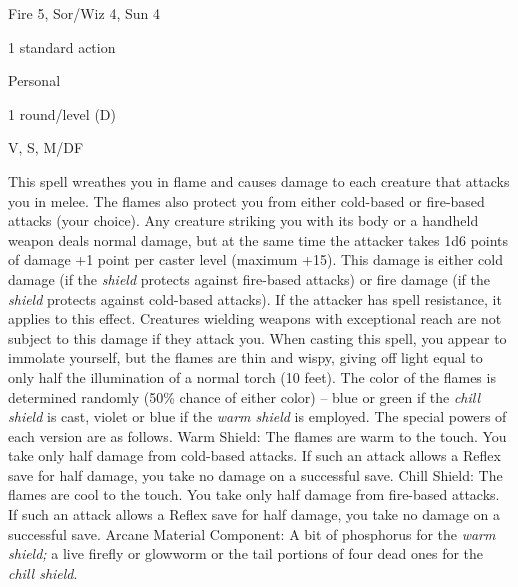 
\begin{description*}
\item[Level:] Fire 5, Sor/Wiz 4, Sun 4
\item[Casting Time:] 1 standard action
\item[Range:] Personal
\item[Duration:] 1 round/level (D)
\item[Components:] V, S, M/DF
\end{description*}

This spell wreathes you in flame and causes damage to each creature that attacks
you in melee. The flames also protect you from either cold-based or fire-based
attacks (your choice).
Any creature striking you with its body or a handheld weapon deals normal damage,
but at the same time the attacker takes 1d6 points of damage +1 point per caster
level (maximum +15). This damage is either cold damage (if the \textit{shield} protects
against fire-based attacks) or fire damage (if the \textit{shield} protects against
cold-based attacks). If the attacker has spell resistance, it applies to this effect.
Creatures wielding weapons with exceptional reach are not subject to this damage
if they attack you.
When casting this spell, you appear to immolate yourself, but the flames are thin
and wispy, giving off light equal to only half the illumination of a normal torch
(10 feet). The color of the flames is determined randomly (50\% chance of either
color) -- blue or green if the \textit{chill shield} is cast, violet or blue if
the \textit{warm shield} is employed. The special powers of each version are as
follows.
Warm Shield: The flames are warm to the touch. You take only half damage
from cold-based attacks. If such an attack allows a Reflex save for half damage,
you take no damage on a successful save.
Chill Shield: The flames are cool to the touch. You take only half damage
from fire-based attacks. If such an attack allows a Reflex save for half damage,
you take no damage on a successful save.
Arcane Material Component: A bit of phosphorus for the \textit{warm shield;
}a live firefly or glowworm or the tail portions of four dead ones for the \textit{chill
shield}.